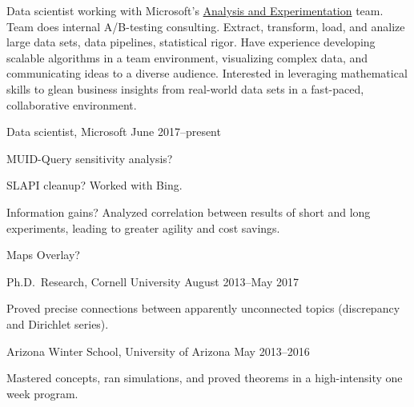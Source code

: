 \documentclass[11pt, letterpaper]{awesome-cv}
\begin{document}
\makecvheader






\begin{cvparagraph}
Data scientist working with Microsoft's \href{http://www.exp-platform.com/Pages/default.aspx}{Analysis and Experimentation} team. 
Team does internal A/B-testing consulting. 
Extract, transform, load, and analize large data sets, data pipelines, statistical rigor. 
Have experience developing scalable algorithms in a team environment, visualizing complex data, and communicating ideas to a diverse audience.
Interested in leveraging mathematical skills to glean business insights from real-world data sets in a fast-paced, collaborative environment. 
\end{cvparagraph}






\begin{cventries}

\cventry
	{Data scientist, Microsoft}
	{}{}
	{June 2017--present}
	{
		\begin{cvitems}
			\item{MUID-Query sensitivity analysis?}
			\item{SLAPI cleanup? Worked with Bing.}
			\item{Information gains? Analyzed correlation between results of short and long experiments, leading to greater agility and cost savings.}
			\item{Maps Overlay?}
		\end{cvitems}
	}

\cventry
	{Ph.D.~Research, Cornell University}
	{}{}
	{August 2013--May 2017}
	{
		\begin{cvitems}
			\item{Proved precise connections between apparently unconnected topics (discrepancy and Dirichlet series).}
		\end{cvitems}
	}
		
\cventry
	{Arizona Winter School, University of Arizona}
	{}{}
	{May 2013--2016}
	{
		\begin{cvitems}
			\item{Mastered concepts, ran simulations, and proved theorems in a high-intensity one week program.}
		\end{cvitems}
	}
\end{cventries}
\end{document}
